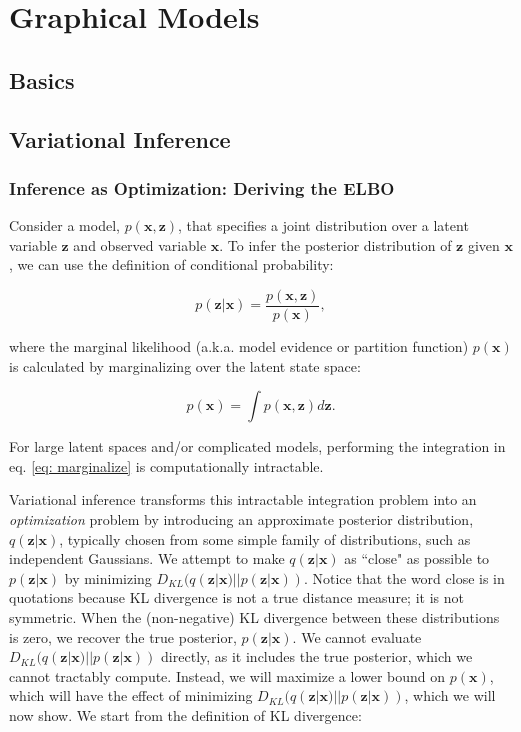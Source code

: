 \chapter{Graphical Models}

\section{Basics}

\section{Variational Inference}

\subsection{Inference as Optimization: Deriving the ELBO}

Consider a model, $p(\mathbf{x}, \mathbf{z})$, that specifies a joint distribution over a latent variable $\mathbf{z}$ and observed variable $\mathbf{x}$. To infer the posterior distribution of $\mathbf{z}$ given $\mathbf{x}$, we can use the definition of conditional probability:

\begin{equation}
	p (\mathbf{z} | \mathbf{x}) = \frac{p(\mathbf{x}, \mathbf{z})}{p (\mathbf{x})},
	\label{eq: bayes rule}
\end{equation}

\noindent where the marginal likelihood (a.k.a. model evidence or partition function) $p(\mathbf{x})$ is calculated by marginalizing over the latent state space:

\begin{equation}
	p (\mathbf{x}) = \int p(\mathbf{x}, \mathbf{z}) d\mathbf{z}.
	\label{eq: marginalize}
\end{equation}

 \noindent For large latent spaces and/or complicated models, performing the integration in eq. \ref{eq: marginalize} is computationally intractable.
 
 Variational inference transforms this intractable integration problem into an \textit{optimization} problem by introducing an approximate posterior distribution, $q (\mathbf{z} | \mathbf{x})$, typically chosen from some simple family of distributions, such as independent Gaussians. We attempt to make $q (\mathbf{z} | \mathbf{x})$ as ``close" as possible to $p (\mathbf{z} | \mathbf{x})$ by minimizing $ D_{KL}(q (\mathbf{z} | \mathbf{x}) || p (\mathbf{z} | \mathbf{x}))$. Notice that the word close is in quotations because KL divergence is not a true distance measure; it is not symmetric. When the (non-negative) KL divergence between these distributions is zero, we recover the true posterior, $p (\mathbf{z} | \mathbf{x})$. We cannot evaluate $ D_{KL}(q (\mathbf{z} | \mathbf{x}) || p (\mathbf{z} | \mathbf{x}))$ directly, as it includes the true posterior, which we cannot tractably compute. Instead, we will maximize a lower bound on $p(\mathbf{x})$, which will have the effect of minimizing $ D_{KL}(q (\mathbf{z} | \mathbf{x}) || p (\mathbf{z} | \mathbf{x}))$, which we will now show. We start from the definition of KL divergence:
 
